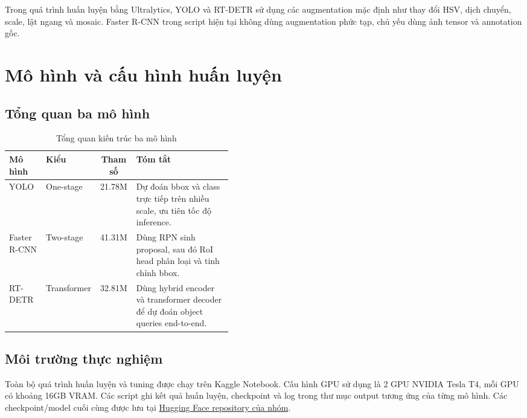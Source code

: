 Trong quá trình huấn luyện bằng Ultralytics, YOLO và RT-DETR sử dụng các augmentation mặc định như thay đổi HSV, dịch chuyển, scale, lật ngang và mosaic. Faster R-CNN trong script hiện tại không dùng augmentation phức tạp, chủ yếu dùng ảnh tensor và annotation gốc.

\section{Mô hình và cấu hình huấn luyện}

\subsection{Tổng quan ba mô hình}

\begin{table}[H]
    \centering
    \caption{Tổng quan kiến trúc ba mô hình}
    \label{tab:model-overview}
    \small
    \begin{tabular}{@{}l l c p{0.43\linewidth}@{}}
        \toprule
        \textbf{Mô hình} & \textbf{Kiểu} & \textbf{Tham số} & \textbf{Tóm tắt} \\
        \midrule
        YOLO & One-stage & 21.78M & Dự đoán bbox và class trực tiếp trên nhiều scale, ưu tiên tốc độ inference. \\
        Faster R-CNN & Two-stage & 41.31M & Dùng RPN sinh proposal, sau đó RoI head phân loại và tinh chỉnh bbox. \\
        RT-DETR & Transformer & 32.81M & Dùng hybrid encoder và transformer decoder để dự đoán object queries end-to-end. \\
        \bottomrule
    \end{tabular}
\end{table}

\subsection{Môi trường thực nghiệm}

Toàn bộ quá trình huấn luyện và tuning được chạy trên Kaggle Notebook. Cấu hình GPU sử dụng là 2 GPU NVIDIA Tesla T4, mỗi GPU có khoảng 16GB VRAM. Các script ghi kết quả huấn luyện, checkpoint và log trong thư mục output tương ứng của từng mô hình. Các checkpoint/model cuối cùng được lưu tại \href{https://huggingface.co/dtdat1234/helmet-violation-detection-models}{Hugging Face repository của nhóm}.

